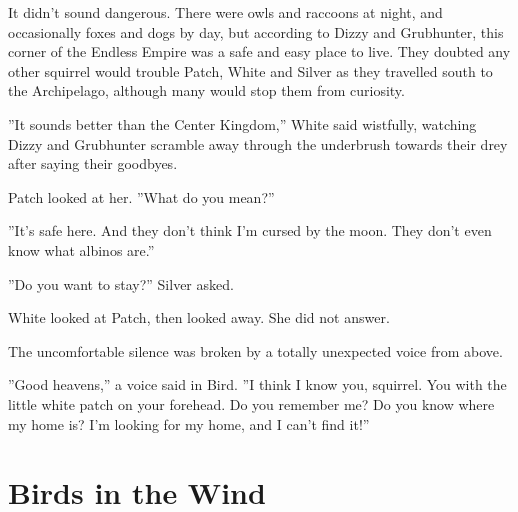 \documentclass[12pt]{book}
\begin{document}
 It didn't sound dangerous. There were owls and raccoons at night, and occasionally foxes and dogs by day, but according to Dizzy and Grubhunter, this corner of the Endless Empire was a safe and easy place to live. They doubted any other squirrel would trouble Patch, White and Silver as they travelled south to the Archipelago, although many would stop them from curiosity.\par
 ''It sounds better than the Center Kingdom,'' White said wistfully, watching Dizzy and Grubhunter scramble away through the underbrush towards their drey after saying their goodbyes.\par
 Patch looked at her. ''What do you mean?''\par
 ''It's safe here. And they don't think I'm cursed by the moon. They don't even know what albinos are.''\par
 ''Do you want to stay?'' Silver asked.\par
 White looked at Patch, then looked away. She did not answer.\par
 The uncomfortable silence was broken by a totally unexpected voice from above.\par
 ''Good heavens,'' a voice said in Bird. ''I think I know you, squirrel. You with the little white patch on your forehead. Do you remember me? Do you know where my home is? I'm looking for my home, and I can't find it!''\par

\section{Birds in the Wind}
\end{document}
